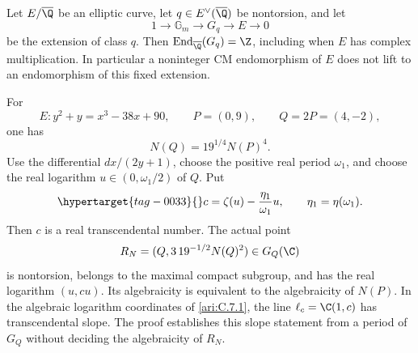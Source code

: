 \begin{proposition}\hypertarget{tag-001I}{}\label{ari:C.7.9}

Let $E/\overline\Q$ be an elliptic curve, let
$q\in E^\vee(\overline\Q)$ be nontorsion, and let
\[
 1\longrightarrow\mathbb G_m\longrightarrow G_q
       \longrightarrow E\longrightarrow0
\]
be the extension of class $q$. Then
$\operatorname{End}_{\overline\Q}(G_q)=\Z$, including when
$E$ has complex multiplication. In particular a noninteger
CM endomorphism of $E$ does not lift to an endomorphism of this
fixed extension.

For
\[
 E:y^2+y=x^3-38x+90,\qquad P=(0,9),\qquad Q=2P=(4,-2),
\]
one has
\[
 N(Q)=19^{1/4}N(P)^4.
\]
Use the differential $dx/(2y+1)$, choose the positive real
period $\omega_1$, and choose the real logarithm
$u\in(0,\omega_1/2)$ of $Q$. Put
\begin{equation}\hypertarget{tag-0033}{}\label{ari:eq:cd-slope}
 c=\zeta(u)-\frac{\eta_1}{\omega_1}u,
 \qquad \eta_1=\eta(\omega_1).
\end{equation}
Then $c$ is a real transcendental number. The actual point
\[
 R_N=(Q,3\,19^{-1/2}N(Q)^2)\in G_Q(\C)
\]
is nontorsion, belongs to the maximal compact subgroup, and has
the real logarithm $(u,cu)$. Its algebraicity is equivalent to
the algebraicity of $N(P)$. In the algebraic logarithm coordinates
of \ref{ari:C.7.1}, the line $\ell_c=\C(1,c)$ has transcendental
slope. The proof establishes this slope statement from a period
of $G_Q$ without deciding the algebraicity of $R_N$.
\end{proposition}


